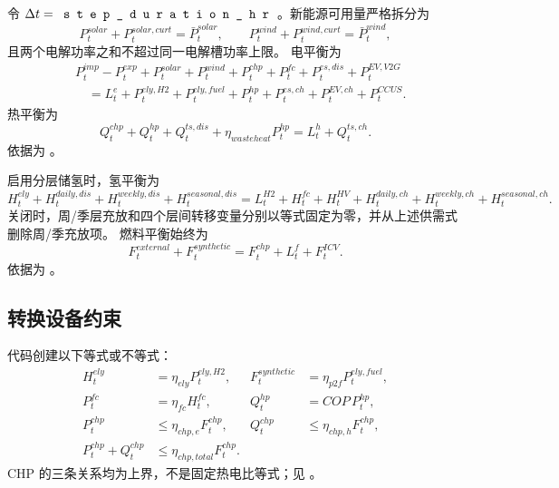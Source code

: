 令 $\Delta t=\fld{step\_duration\_hr}$。新能源可用量严格拆分为
\begin{equation}
 P_t^{solar}+P_t^{solar,curt}=\bar P_t^{solar},\qquad
 P_t^{wind}+P_t^{wind,curt}=\bar P_t^{wind},
\end{equation}
且两个电解功率之和不超过同一电解槽功率上限。
电平衡为
\begin{align}
 &P_t^{imp}-P_t^{exp}+P_t^{solar}+P_t^{wind}+P_t^{chp}+P_t^{fc}
 +P_t^{es,dis}+P_t^{EV,V2G}\nonumber\\
 &\quad=L_t^e+P_t^{ely,H2}+P_t^{ely,fuel}+P_t^{hp}+P_t^{es,ch}
 +P_t^{EV,ch}+P_t^{CCUS}.
\end{align}
热平衡为
\begin{equation}
 Q_t^{chp}+Q_t^{hp}+Q_t^{ts,dis}+\eta_{wasteheat}P_t^{hp}
 =L_t^h+Q_t^{ts,ch}.
\end{equation}
依据为 。

启用分层储氢时，氢平衡为
\begin{equation}
 H_t^{ely}+H_t^{daily,dis}+H_t^{weekly,dis}+H_t^{seasonal,dis}
 =L_t^{H2}+H_t^{fc}+H_t^{HV}+H_t^{daily,ch}+H_t^{weekly,ch}+H_t^{seasonal,ch}.
\end{equation}
关闭时，周/季层充放和四个层间转移变量分别以等式固定为零，并从上述供需式删除周/季充放项。
燃料平衡始终为
\begin{equation}
 F_t^{external}+F_t^{synthetic}=F_t^{chp}+L_t^f+F_t^{ICV}.
\end{equation}
依据为 。

\subsection{转换设备约束}

代码创建以下等式或不等式：
\begin{align}
 H_t^{ely}&=\eta_{ely}P_t^{ely,H2},&
 F_t^{synthetic}&=\eta_{p2f}P_t^{ely,fuel},\\
 P_t^{fc}&=\eta_{fc}H_t^{fc},&
 Q_t^{hp}&=COP\,P_t^{hp},\\
 P_t^{chp}&\le\eta_{chp,e}F_t^{chp},&
 Q_t^{chp}&\le\eta_{chp,h}F_t^{chp},\\
 P_t^{chp}+Q_t^{chp}&\le\eta_{chp,total}F_t^{chp}.
\end{align}
CHP 的三条关系均为上界，不是固定热电比等式；见
。

